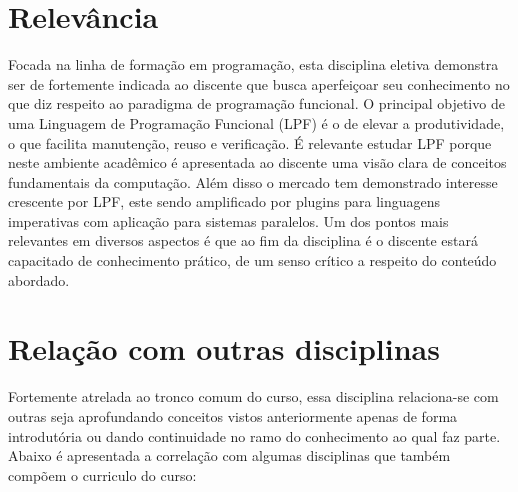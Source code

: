 \documentclass[10pt,twoside,a4paper]{article}
\begin{document}
\section{Relevância} 

Focada na linha de formação em programação, esta disciplina eletiva demonstra ser de fortemente indicada ao discente que busca aperfeiçoar seu conhecimento no que diz respeito ao paradigma de programação funcional. O principal objetivo de uma Linguagem de Programação Funcional (LPF) é o de elevar a produtividade, o que facilita manutenção, reuso e verificação. É relevante estudar LPF porque neste ambiente acadêmico é apresentada ao discente uma visão clara de conceitos fundamentais da computação. Além disso o mercado tem demonstrado interesse crescente por LPF, este sendo amplificado por plugins para linguagens imperativas com aplicação para sistemas paralelos. Um dos pontos mais relevantes em diversos aspectos é que ao fim da disciplina é o discente estará capacitado de conhecimento prático, de um senso crítico a respeito do conteúdo abordado.


\section{Relação com outras disciplinas}

Fortemente atrelada ao tronco comum do curso, essa disciplina relaciona-se com outras seja aprofundando conceitos vistos anteriormente apenas de forma introdutória ou dando continuidade no ramo do conhecimento ao qual faz parte. Abaixo é apresentada a correlação com algumas disciplinas que também compõem o curriculo do curso:

								
\end{document}
